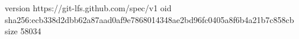 version https://git-lfs.github.com/spec/v1
oid sha256:ecb338d2dbb62a87aad0af9e7868014348ae2bd96fc0405a8f6b4a21b7c858cb
size 58034
